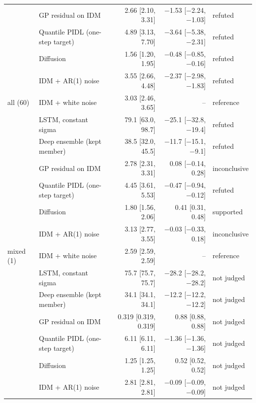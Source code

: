 \begin{table}[htbp]
\begin{tabular}{llrrl}
 & GP residual on IDM & 2.66 [2.10, 3.31] & $-$1.53 [$-$2.24, $-$1.03] & refuted \\
 & Quantile PIDL (one-step target) & 4.89 [3.13, 7.70] & $-$3.64 [$-$5.38, $-$2.31] & refuted \\
 & Diffusion & 1.56 [1.20, 1.95] & $-$0.48 [$-$0.85, $-$0.16] & refuted \\
 & IDM + AR(1) noise & 3.55 [2.66, 4.48] & $-$2.37 [$-$2.98, $-$1.83] & refuted \\
\midrule
all (60) & IDM + white noise & 3.03 [2.46, 3.65] & -- & reference \\
 & LSTM, constant sigma & 79.1 [63.0, 98.7] & $-$25.1 [$-$32.8, $-$19.4] & refuted \\
 & Deep ensemble (kept member) & 38.5 [32.0, 45.5] & $-$11.7 [$-$15.1, $-$9.1] & refuted \\
 & GP residual on IDM & 2.78 [2.31, 3.31] & 0.08 [$-$0.14, 0.28] & inconclusive \\
 & Quantile PIDL (one-step target) & 4.45 [3.61, 5.53] & $-$0.47 [$-$0.94, $-$0.12] & refuted \\
 & Diffusion & 1.80 [1.56, 2.06] & 0.41 [0.31, 0.48] & supported \\
 & IDM + AR(1) noise & 3.13 [2.77, 3.55] & $-$0.03 [$-$0.33, 0.18] & inconclusive \\
\midrule
mixed (1) & IDM + white noise & 2.59 [2.59, 2.59] & -- & reference \\
 & LSTM, constant sigma & 75.7 [75.7, 75.7] & $-$28.2 [$-$28.2, $-$28.2] & not judged \\
 & Deep ensemble (kept member) & 34.1 [34.1, 34.1] & $-$12.2 [$-$12.2, $-$12.2] & not judged \\
 & GP residual on IDM & 0.319 [0.319, 0.319] & 0.88 [0.88, 0.88] & not judged \\
 & Quantile PIDL (one-step target) & 6.11 [6.11, 6.11] & $-$1.36 [$-$1.36, $-$1.36] & not judged \\
 & Diffusion & 1.25 [1.25, 1.25] & 0.52 [0.52, 0.52] & not judged \\
 & IDM + AR(1) noise & 2.81 [2.81, 2.81] & $-$0.09 [$-$0.09, $-$0.09] & not judged \\
\bottomrule
\end{tabular}
\end{table}
